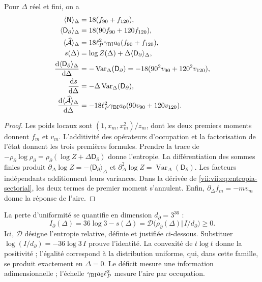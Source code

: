 \begin{proposition}
\label{vii:vii:prop:respuesta-sectorial}
Pour \(\Delta\) réel et fini, on a
\begin{align}
 \langle\mathsf N\rangle_\Delta&=18(f_{90}+f_{120}),\\
 \langle\mathsf D_\partial\rangle_\Delta&=18(90f_{90}+120f_{120}),\\
 \langle\widehat{\mathcal A}\rangle_\Delta
 &=18\ell_P^2\gamma_{\rm BI}a_0(f_{90}+f_{120}),\\
 s(\Delta)&=\log Z(\Delta)+\Delta\langle\mathsf D_\partial\rangle_\Delta,
 \label{vii:vii:eq:entropia-sectorial}\\
 \frac{\mathrm d\langle\mathsf D_\partial\rangle_\Delta}{\mathrm d\Delta}
 &=-\operatorname{Var}_\Delta(\mathsf D_\partial)
  =-18(90^2v_{90}+120^2v_{120}),\\
 \frac{\mathrm ds}{\mathrm d\Delta}
 &=-\Delta\operatorname{Var}_\Delta(\mathsf D_\partial),\\
 \frac{\mathrm d\langle\widehat{\mathcal A}\rangle_\Delta}{\mathrm d\Delta}
 &=-18\ell_P^2\gamma_{\rm BI}a_0(90v_{90}+120v_{120}).
 \label{vii:vii:eq:respuestas-area-entropia}
\end{align}
\end{proposition}
\begin{proof}
Les poids locaux sont \((1,x_m,x_m^2)/z_m\), dont les deux premiers moments donnent \(f_m\) et \(v_m\). L'additivité des opérateurs d'occupation et la factorisation de l'état donnent les trois premières formules. Prendre la trace de \(-\rho_\partial\log\rho_\partial
=\rho_\partial(\log Z+\Delta\mathsf D_\partial)\) donne l'entropie. La différentiation des sommes finies produit \(\partial_\Delta\log Z=-\langle\mathsf D_\partial\rangle_\Delta\) et \(\partial_\Delta^2\log Z
=\operatorname{Var}_\Delta(\mathsf D_\partial)\). Les facteurs indépendants additionnent leurs variances. Dans la dérivée de \eqref{vii:vii:eq:entropia-sectorial}, les deux termes de premier moment s'annulent. Enfin, \(\partial_\Delta f_m=-mv_m\) donne la réponse de l'aire.
\end{proof}

La perte d'uniformité se quantifie en dimension \(d_\partial=3^{36}\) :
\begin{equation}
 I_\partial(\Delta)
 =36\log3-s(\Delta)
 =\mathcal D\bigl(\rho_\partial(\Delta)\Vert I/d_\partial\bigr)\ge0.
 \label{vii:vii:eq:deficit-informacional}
\end{equation}
Ici, \(\mathcal D\) désigne l'entropie relative, définie et justifiée
ci-dessous. Substituer \(\log(I/d_\partial)=-36\log3\,I\) prouve
l'identité. La convexité de \(t\log t\) donne la positivité ; l'égalité
correspond à la distribution uniforme, qui, dans cette famille, se produit
exactement en \(\Delta=0\). Le déficit mesure une information adimensionnelle ;
l'échelle \(\gamma_{\rm BI}a_0\ell_P^2\) mesure l'aire par occupation.

